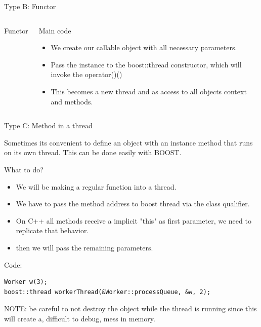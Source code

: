 \documentclass[8pt]{beamer}
\begin{document}
\begin{frame}[fragile]{Type B: Functor}
\begin{columns}
\begin{block}{Functor}
\end{block}
\vspace{-8px}
\begin{block}{Main code}
 
\begin{itemize}
  \item We create our callable object with all necessary parameters.
  \item Pass the instance to the boost::thread constructor, which will invoke the operator()()
  \item This becomes a new thread and as access to all objects context and methods.
\end{itemize}

\end{block}

\end{columns}
 
\end{frame}

\begin{frame}[fragile]{Type C: Method in a thread}

Sometimes its convenient to define an object with an instance method that runs on its own thread. This can be done easily with BOOST.

\begin{block}{What to do?}

\begin{itemize}
  \item We will be making a regular function into a thread.
  \item We have to pass the method address to boost thread via the class qualifier.
  \item On C++ all methods receive a implicit "this" as first parameter, we need to replicate that behavior.
  \item then we will pass the remaining parameters.
\end{itemize}

\end{block}

\begin{exampleblock}{Code:}

\begin{lstlisting}
Worker w(3);
boost::thread workerThread(&Worker::processQueue, &w, 2);
\end{lstlisting}

\end{exampleblock}

NOTE: be careful to not destroy the object while the thread is running since this will create a, difficult to debug, mess in memory.

\end{frame}
\end{document}
